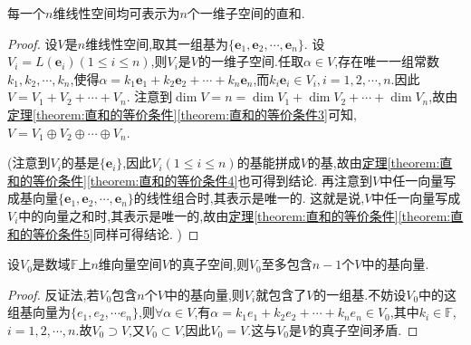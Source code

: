 \documentclass[lang=cn,newtx,10pt,scheme=chinese]{elegantbook}
\begin{document}
\begin{proposition}\label{proposition:n维线性空间的一维直和分解}
每一个\(n\)维线性空间均可表示为\(n\)个一维子空间的直和.
\end{proposition}
\begin{proof}
    设\(V\)是\(n\)维线性空间,取其一组基为\(\{\boldsymbol{e}_1,\boldsymbol{e}_2,\cdots,\boldsymbol{e}_n\}\). 设\(V_i = L(\boldsymbol{e}_i)(1\leq i\leq n)\),则\(V_i\)是\(V\)的一维子空间.任取$\alpha\in V$,存在唯一一组常数$k_1,k_2,\cdots,k_n$,使得$\alpha =k_1\boldsymbol{e}_1+k_2\boldsymbol{e}_2+\cdots +k_n\boldsymbol{e}_n$,而$k_i\boldsymbol{e}_i\in V_i,i=1,2,\cdots ,n.$因此\(V = V_1 + V_2+\cdots+V_n\). 注意到\(\dim V = n=\dim V_1+\dim V_2+\cdots+\dim V_n\),故由\hyperref[theorem:直和的等价条件3]{定理\ref{theorem:直和的等价条件}\ref{theorem:直和的等价条件3}}可知,\(V = V_1\oplus V_2\oplus\cdots\oplus V_n\). 
    
    (注意到\(V_i\)的基是\(\{\boldsymbol{e}_i\}\),因此\(V_i(1\leq i\leq n)\)的基能拼成\(V\)的基,故由\hyperref[theorem:直和的等价条件4]{定理\ref{theorem:直和的等价条件}\ref{theorem:直和的等价条件4}}也可得到结论. 再注意到\(V\)中任一向量写成基向量\(\{\boldsymbol{e}_1,\boldsymbol{e}_2,\cdots,\boldsymbol{e}_n\}\)的线性组合时,其表示是唯一的. 这就是说,\(V\)中任一向量写成\(V_i\)中的向量之和时,其表示是唯一的,故由\hyperref[theorem:直和的等价条件5]{定理\ref{theorem:直和的等价条件}\ref{theorem:直和的等价条件5}}同样可得结论. )
\end{proof}

\begin{proposition}\label{proposition:真子空间至多包含n-1个基向量}
设\(V_0\)是数域\(\mathbb{F}\)上$n$维向量空间\(V\)的真子空间,则\(V_0\)至多包含$n-1$个$V$中的基向量.
\end{proposition}
\begin{proof}
反证法,若$V_0$包含\(n\)个\(V\)中的基向量,则$V_i$就包含了$V$的一组基.不妨设$V_0$中的这组基向量为$\{e_1,e_2,\cdots e_n\}$,则$\forall \alpha\in V$,有$\alpha =k_1e_1+k_2e_2+\cdots +k_ne_n \in V_0$,其中$k_i\in \mathbb{F}$,$i=1,2,\cdots,n$.故$V_0\supset V$,又$V_0\subset V$,因此$V_0=V$.这与\(V_0\)是\(V\)的真子空间矛盾.
\end{proof}
\end{document}
